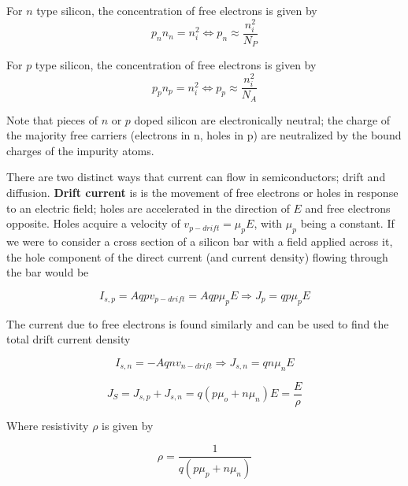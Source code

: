 \documentclass[../notes.tex]{subfiles}
\begin{document}
\begin{theorem}

	For $ n $ type silicon, the concentration of free electrons is given by
	\begin{equation}
		p_n n_n = n_i^2 \Leftrightarrow p_n \approx \frac{n_i^2}{N_P}
	\end{equation}
	
	For $ p $ type silicon, the concentration of free electrons is given by
	\begin{equation}
		p_p n_p = n_i^2 \Leftrightarrow p_p \approx \frac{n_i^2}{N_A}
	\end{equation}
\end{theorem}

Note that pieces of $ n $ or $ p $ doped silicon are electronically neutral; the charge of the majority free carriers (electrons in n, holes in p) are neutralized by the bound charges of the impurity atoms.



There are two distinct ways that current can flow in semiconductors; drift and diffusion.
\textbf{Drift current} is is the movement of free electrons or holes in response to an electric field; holes are accelerated in the direction of $ E $ and free electrons opposite.
Holes acquire a velocity of $ v_{p-drift}  = \mu_p E $, with $ \mu_p $ being a constant. If we were to consider a cross section of a silicon bar with a field applied across it, the hole component of the direct current (and current density) flowing through the bar would be 

\begin{equation}
	I_{s,p}  = A qpv_{p-drift}  = Aqp\mu_p E \Rightarrow J_p = qp\mu_p E
\end{equation}

The current due to free electrons is found similarly and can be used to find the total drift current density


\begin{equation}
	I_{s,n}  = -Aqnv_{n-drift}  \Rightarrow J_{s,n} = qn\mu_n E
\end{equation}


\begin{equation}
	J_S = J_{s,p}  + J_{s,n} = q(p\mu_o + n \mu_n) E = \frac{E}{\rho}
	\label{eq:360:drift_current}
\end{equation}

Where resistivity $ \rho $ is given by

\begin{equation}
	\rho = \frac{1}{q(p\mu_p + n \mu_n)}
\end{equation}
\end{document}
